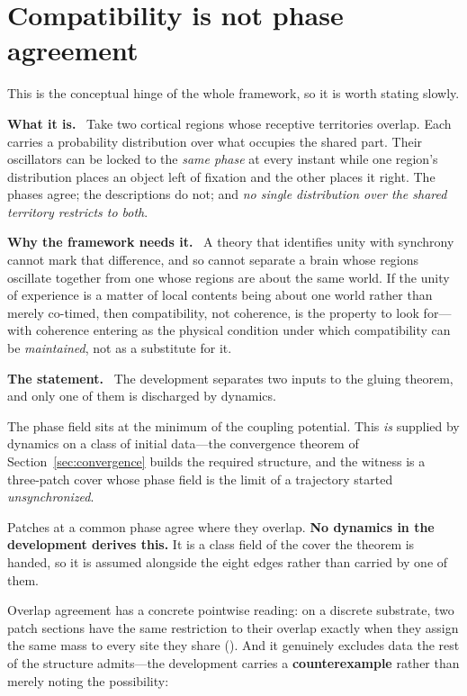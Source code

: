 \documentclass[11pt]{article}
\newcommand{\what}{\par\smallskip\noindent\textbf{What it is.}\ }
\newcommand{\why}{\par\smallskip\noindent\textbf{Why the framework needs it.}\ }
\newcommand{\statement}{\par\smallskip\noindent\textbf{The statement.}\ }
\newcommand{\id}[1]{{\small\ttfamily\seqsplit{#1}}}
\begin{document}
\section{Compatibility is not phase agreement}
\label{sec:compat}

This is the conceptual hinge of the whole framework, so it is worth stating
slowly.

\what
Take two cortical regions whose receptive territories overlap. Each carries a
probability distribution over what occupies the shared part. Their oscillators
can be locked to the \emph{same phase} at every instant while one region's
distribution places an object left of fixation and the other places it right.
The phases agree; the descriptions do not; and \emph{no single distribution
over the shared territory restricts to both}.

\why
A theory that identifies unity with synchrony cannot mark that difference, and
so cannot separate a brain whose regions oscillate together from one whose
regions are about the same world. If the unity of experience is a matter of
local contents being about one world rather than merely co-timed, then
compatibility, not coherence, is the property to look for---with coherence
entering as the physical condition under which compatibility can be
\emph{maintained}, not as a substitute for it.

\statement
The development separates two inputs to the gluing theorem, and only one of
them is discharged by dynamics.

\begin{description}[leftmargin=*,style=nextline]
\item[Thermodynamic equilibrium (discharged).] The phase field sits at the
minimum of the coupling potential. This \emph{is} supplied by dynamics on a
class of initial data---the convergence theorem of
Section~\ref{sec:convergence} builds the required structure, and the witness is
a three-patch cover whose phase field is the limit of a trajectory started
\emph{unsynchronized}.
\item[Overlap agreement (not discharged).] Patches at a common phase agree
where they overlap. \textbf{No dynamics in the development derives this.} It is
a class field of the cover the theorem is handed, so it is assumed alongside
the eight edges rather than carried by one of them.
\end{description}

\noindent
Overlap agreement has a concrete pointwise reading: on a discrete substrate,
two patch sections have the same restriction to their overlap exactly when they
assign the same mass to every site they share
(\id{restrict\_eq\_iff\_densityOn\_eqOn}). And it genuinely excludes data the
rest of the structure admits---the development carries a \textbf{counterexample}
rather than merely noting the possibility:
\end{document}
